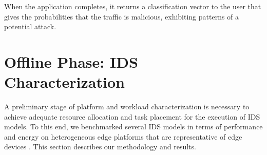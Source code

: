 When the application completes, it returns a classification vector to the user that gives the probabilities that the traffic is malicious, exhibiting patterns of a potential attack.

\section{Offline Phase: IDS Characterization} 
\label{section:herocache-workload}



A preliminary stage of platform and workload characterization is necessary to achieve adequate resource allocation and task placement for the execution of IDS models. To this end, we benchmarked several IDS models in terms of performance and energy on heterogeneous edge platforms that are representative of edge devices \cite{kljucaric2020}. %
This section describes our methodology and results.


